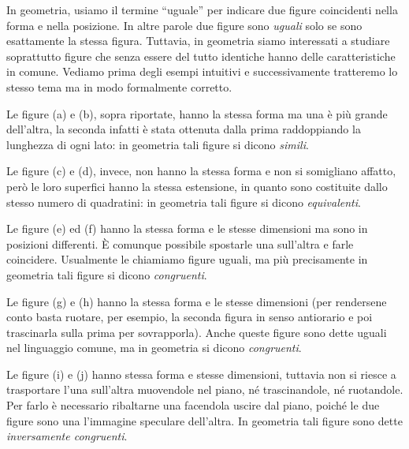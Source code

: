 In geometria, usiamo il termine ``uguale'' per indicare due figure coincidenti nella forma e nella posizione. In altre parole due figure sono \emph{uguali} solo se sono esattamente la stessa figura. Tuttavia, in geometria siamo interessati a studiare soprattutto figure che senza essere del tutto identiche hanno delle caratteristiche in comune. Vediamo prima degli esempi intuitivi e successivamente tratteremo lo stesso tema ma in modo formalmente corretto.

\begin{figure}[htb]
\centering\qquad\qquad

\end{figure}

Le figure (a) e (b), sopra riportate, hanno la stessa forma ma una è più grande dell'altra, la seconda infatti è stata ottenuta dalla prima raddoppiando la lunghezza di ogni lato: in geometria tali figure si dicono \emph{simili}.

Le figure (c) e (d), invece, non hanno la stessa forma e non si somigliano affatto, però le loro superfici hanno la stessa estensione, in quanto sono costituite dallo stesso numero di quadratini: in geometria tali figure si dicono \emph{equivalenti}.

\begin{figure}[htb]
\centering\qquad\qquad

\end{figure}

Le figure (e) ed (f) hanno la stessa forma e le stesse dimensioni ma sono in posizioni differenti. \`E comunque possibile spostarle una sull'altra e farle coincidere. Usualmente le chiamiamo figure uguali, ma più precisamente in geometria tali figure si dicono \emph{congruenti}.

Le figure (g) e (h) hanno la stessa forma e le stesse dimensioni (per rendersene conto basta ruotare, per esempio, la seconda figura in senso antiorario e poi trascinarla sulla prima per sovrapporla). Anche queste figure sono dette uguali nel linguaggio comune, ma in geometria si dicono \emph{congruenti}.

Le figure (i) e (j) hanno stessa forma e stesse dimensioni, tuttavia non si riesce a trasportare l'una sull'altra muovendole nel piano, né trascinandole, né ruotandole. Per farlo è necessario ribaltarne una facendola uscire dal piano, poiché le due figure sono una l'immagine speculare dell'altra. In geometria tali figure sono dette \emph{inversamente congruenti}.

